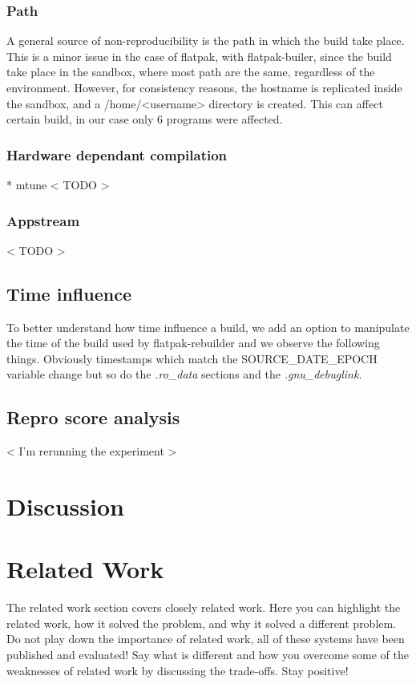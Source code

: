 \documentclass[a4paper,11pt,oneside]{report}
\theoremstyle{definition}
\newcommand{\sysname}{flatpak-rebuilder\xspace}
\newcommand{\fp}{flatpak\xspace}
\newcommand{\fb}{flatpak-builer\xspace}
\newcommand{\sde}{SOURCE\_DATE\_EPOCH\xspace}
\begin{document}
\subsection*{Path}
A general source of non-reproducibility is the path in which the build take
place. This is a minor issue in the case of \fp, with \fb, since the build take
place in the sandbox, where most path are the same, regardless of the
environment. However, for consistency reasons, the hostname is replicated
inside the sandbox, and a /home/<username> directory is created. This can
affect certain build, in our case only 6 programs were affected.

\subsection*{Hardware dependant compilation}
* mtune
< TODO >

\subsection*{Appstream}
< TODO >

\section*{Time influence}
To better understand how time influence a build, we add an option to manipulate
the time of the build used by \sysname and we observe the following things.
Obviously timestamps which match the \sde variable change but so do the
\emph{.ro\_data} sections and the \emph{.gnu\_debuglink}.

\section{Repro score analysis}
< I'm rerunning the experiment >

\chapter{Discussion}
\label{chap:disc}


\chapter{Related Work}

The related work section covers closely related work. Here you can highlight
the related work, how it solved the problem, and why it solved a different
problem. Do not play down the importance of related work, all of these
systems have been published and evaluated! Say what is different and how
you overcome some of the weaknesses of related work by discussing the
trade-offs. Stay positive!
\end{document}

